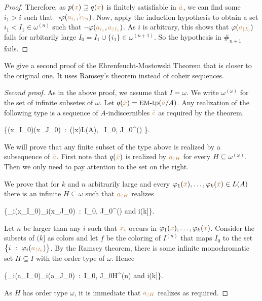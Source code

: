 \begin{proof}

Therefore, as $p({\color{brown} x})\supseteq q({\color{brown} x})$ is finitely satisfiable in ${\color{brown}\bar a}$, we can find some $i_1>i$ such that $\neg\phi({\mr a_{i_1}},{\mr\cev{c}_{\restriction n}})$.
Now, apply the induction hypothesis to obtain a set $i_1<I_1\in\omega^{(n)}$ such that $\neg\varphi({\color{brown} a_{i_1}},{\color{brown} a_{\restriction I_1}})$.
As $i$ is arbitrary, this shows that $\varphi({\color{brown} a_{\restriction I_0}})$ fails for arbitarily large $I_0=I_1\cup\{i_1\}\in\omega^{(n+1)}$.
So the hypothesis in $\#_{n+1}$ fails.
\end{proof}

We give a second proof of the Ehrenfeucht-Mostowski Theorem that is closer to the original one.
It uses Ramsey's theorem instead of coheir sequences.

\begin{proof}[Second proof]
  As in the above proof, we assume that $I=\omega$.
  We write $\omega^{(\omega)}$ for the set of infinite subsetes of $\omega$.
  Let $q({\color{brown}\bar x})=\mbox{{\small EM}-tp}({\color{brown}\bar a}/A)$.
  Any realization of the following type is a sequence of $A$-indiscernibles ${\color{brown}\bar c}$ as required by the theorem.

  {\cup}
  {\Big\{\phi({\mr x_{\restriction I_0}})\iff\phi({\mr x_{\restriction J_0}})\ :\  \phi({\mr\bar x})\in L(A), \ I_0, J_0\in\omega^{(\omega)} \Big\}.}

  We will prove that any finite subset of the type above is realized by a subsequence of ${\color{brown}\bar a}$.
  First note that $q({\color{brown}\bar x})$ is realized by ${\color{brown} a_{\restriction H}}$ for every $H\subseteq\omega^{(\omega)}$.
  Then we only need to pay attention to the set on the right.

  We prove that for $k$ and $n$ arbitrarily large and every $\varphi_1({\color{brown}\bar x}),\dots,\varphi_k({\color{brown}\bar x})\in L(A)$ there is an infinite $H\subseteq\omega$ such that ${\color{brown} a_{\restriction H}}$ realizes

  \ceq{\ssf{\#}}
  {}
  {\Big\{\phi_i({\mr x_{\restriction I_0}})\iff\phi_i({\mr x_{\restriction J_0}})\ :\  I_0, J_0\in\omega^{(\omega)}\textrm{ and } i\in(k]\Big\}.}

  Let $n$ be larger than any $i$ such that ${\color{brown} x_i}$ occurs in $\varphi_1({\color{brown}\bar x}),\dots,\varphi_k({\color{brown}\bar x})$.
  Consider the subsets of $(k]$ as colors and let $f$ be the coloring of $I^{(n)}$ that maps $I_0$ to the set $\big\{i\ :\ \varphi_i({\color{brown} a_{\restriction I_0}})\big\}$.
  By the Ramsey theorem,
  there is some infinite monochromatic set $H\subseteq I$ with the order type of $\omega$.
  Hence

  \ceq{}
  {}
  {\Big\{\phi_i({\mr a_{\restriction I_0}})\iff\phi_i({\mr a_{\restriction J_0}})\ :\  I_0, J_0\in H^{(n)}\textrm{ and } i\in(k]\Big\}.}

  As $H$ has order type $\omega$,
  it is immediate that ${\color{brown} a_{\restriction H}}$ realizes \ssf{\#}
  as required.
\end{proof}

